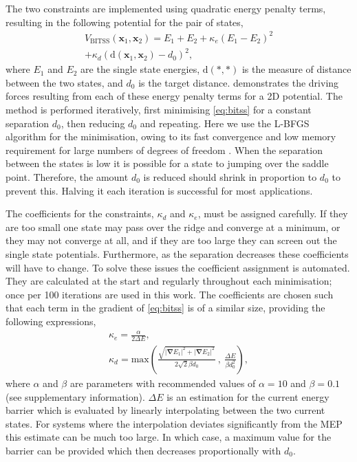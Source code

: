 \documentclass[aps,twocolumn]{revtex4}
\begin{document}
The two constraints are implemented using quadratic energy penalty terms, resulting in the following potential for the pair of states,
\begin{multline}
  V_\text{BITSS}(\bm{x}_1, \bm{x}_2) = E_1 + E_2
    + \kappa_e \left( E_1 - E_2 \right) ^2 \\
    + \kappa_d \left( \mathrm{d}(\bm{x}_1, \bm{x}_2) - d_0 \right) ^2,
  \label{eq:bitss}
\end{multline}
where $E_1$ and $E_2$ are the single state energies, $\mathrm{d}(\ast, \ast)$ is the measure of distance between the two states, and $d_0$ is the target distance.  demonstrates the driving forces resulting from each of these energy penalty terms for a 2D potential. The method is performed iteratively, first minimising \cref{eq:bitss} for a constant separation $d_0$, then reducing $d_0$ and repeating. Here we use the L-BFGS algorithm for the minimisation, owing to its fast convergence and low memory requirement for large numbers of degrees of freedom \cite{Liu1989}. When the separation between the states is low it is possible for a state to jumping over the saddle point. Therefore, the amount $d_0$ is reduced should shrink in proportion to $d_0$ to prevent this. Halving it each iteration is successful for most applications.

The coefficients for the constraints, $\kappa_d$ and $\kappa_e$, must be assigned carefully. If they are too small one state may pass over the ridge and converge at a minimum, or they may not converge at all, and if they are too large they can screen out the single state potentials. Furthermore, as the separation decreases these coefficients will have to change.
To solve these issues the coefficient assignment is automated. They are calculated at the start and regularly throughout each minimisation; once per 100 iterations are used in this work. The coefficients are chosen such that each term in the gradient of \cref{eq:bitss} is of a similar size, providing the following expressions,
\begin{gather}
  \kappa_e = \frac {\alpha} {2 \Delta E},
  \label{eq:ke}
  \\
  \kappa_d = \text{max} \left(
    \frac {\sqrt{|\bm{\nabla} E_1|^2 + |\bm{\nabla} E_2|^2}} {2\sqrt{2} \beta d_0} \ , \ 
    \frac{\Delta E}{\beta d_0^2} \right),
  \label{eq:kd}
\end{gather}
where $\alpha$ and $\beta$ are parameters with recommended values of $\alpha = 10$ and $\beta = 0.1$ (see supplementary information). $\Delta E$ is an estimation for the current energy barrier which is evaluated by linearly interpolating between the two current states. For systems where the interpolation deviates significantly from the MEP this estimate can be much too large. In which case, a maximum value for the barrier can be provided which then decreases proportionally with $d_0$.
\end{document}
